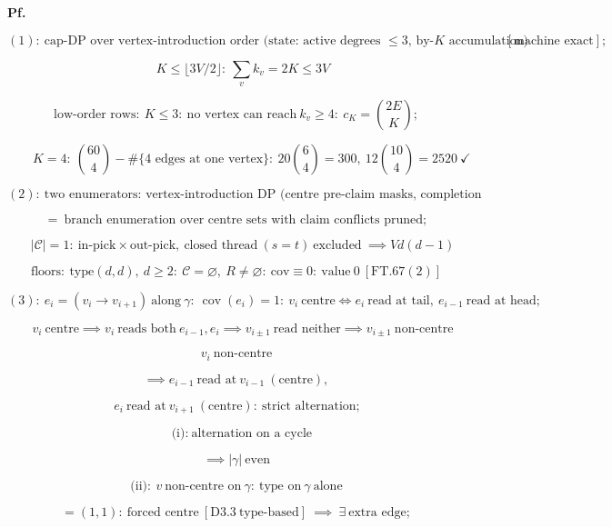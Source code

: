 \begin{theorem}
\textbf{Pf.}

\[
(1):\ \text{cap-DP over vertex-introduction order (state: active degrees $\le3$, by-$K$ accumulation)}\ [\text{machine exact}];
\]

\[
\quad K\le\lfloor 3V/2\rfloor:\ \textstyle\sum_vk_v=2K\le3V
\]

\[
\text{low-order rows}:\ K\le3:\ \text{no vertex can reach}\ k_v\ge4:\ c_K=\binom{2E}K;
\]

\[
\qquad K=4:\ \binom{60}4-\#\{\text{4 edges at one vertex}\}:\ 20\binom64=300,\ 12\binom{10}4=2520\ \checkmark
\]

\[
(2):\ \text{two enumerators: vertex-introduction DP (centre pre-claim masks, completion checks)}\
\]

\[
= \ \text{branch enumeration over centre sets with claim conflicts pruned};
\]

\[
\quad |\mathcal C|=1:\ \text{in-pick}\times\text{out-pick},\ \text{closed thread}\ (s{=}t)\ \text{excluded}\ \implies Vd(d{-}1)
\]

\[
\text{floors}:\ \text{type}(d,d),\ d\ge2:\ \mathcal C=\varnothing,\ R\ne\varnothing:\ \text{cov}\equiv0:\ \text{value}\ 0\ [\mathrm{FT.67}(2)]
\]

\[
(3):\ e_i=(v_i\to v_{i+1})\ \text{along}\ \gamma:\ \operatorname{cov}(e_i)=1:\ v_i\ \text{centre}\iff e_i\ \text{read at tail},\ e_{i-1}\ \text{read at head};
\]

\[
\quad v_i\ \text{centre}\implies v_i\ \text{reads both}\ e_{i-1},e_i\implies v_{i\pm1}\ \text{read neither}\implies v_{i\pm1}\ \text{non-centre}
\]

\[
v_i\ \text{non-centre}
\]

\[
\implies e_{i-1}\ \text{read at}\ v_{i-1}\ (\text{centre}),
\]

\[
\ e_i\ \text{read at}\ v_{i+1}\ (\text{centre}):\ \text{strict alternation};
\]

\[
\quad\text{(i)}:\ \text{alternation on a cycle}
\]

\[
\implies |\gamma|\ \text{even}
\]

\[
\text{(ii)}:\ v\ \text{non-centre on}\ \gamma:\ \text{type on}\ \gamma\ \text{alone}
\]

\[
= (1,1):\ \text{forced centre}\ [\mathrm{D3.3}\ \text{type-based}]\ \implies\ \exists\ \text{extra edge};
\]


\end{theorem}
